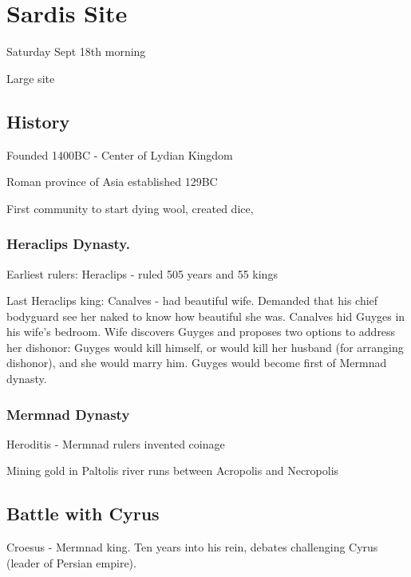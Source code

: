 \documentclass[
]{book}
\begin{document}
\hypertarget{sardis-site}{%
\chapter{Sardis Site}\label{sardis-site}}

Saturday Sept 18th morning

Large site

\hypertarget{history-2}{%
\section{History}\label{history-2}}

Founded 1400BC - Center of Lydian Kingdom

Roman province of Asia established 129BC

First community to start dying wool, created dice,

\hypertarget{heraclips-dynasty.}{%
\subsection{Heraclips Dynasty.}\label{heraclips-dynasty.}}

Earliest rulers: Heraclips - ruled 505 years and 55 kings

Last Heraclips king: Canalves - had beautiful wife. Demanded that his chief bodyguard see her naked to know how beautiful she was. Canalves hid Guyges in his wife's bedroom. Wife discovers Guyges and proposes two options to address her dishonor: Guyges would kill himself, or would kill her husband (for arranging dishonor), and she would marry him. Guyges would become first of Mermnad dynasty.

\hypertarget{mermnad-dynasty}{%
\subsection{Mermnad Dynasty}\label{mermnad-dynasty}}

Heroditis - Mermnad rulers invented coinage

Mining gold in Paltolis river runs between Acropolis and Necropolis

\hypertarget{battle-with-cyrus}{%
\section{Battle with Cyrus}\label{battle-with-cyrus}}

Croesus - Mermnad king. Ten years into his rein, debates challenging Cyrus (leader of Persian empire).
\end{document}
